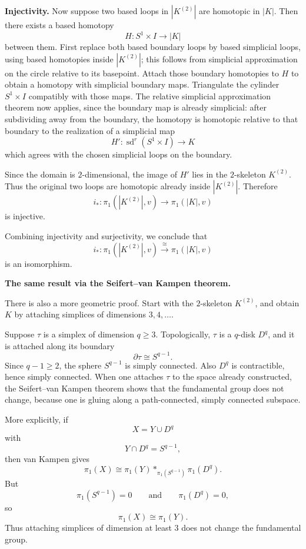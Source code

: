 \begin{solution}
\par

\textbf{Injectivity.}
Now suppose two based loops in \(|K^{(2)}|\) are homotopic in \(|K|\). Then there exists a based homotopy
\[
H:S^1\times I \to |K|
\]
between them. First replace both based boundary loops by based simplicial loops, using based homotopies inside \(|K^{(2)}|\); this follows from simplicial approximation on the circle relative to its basepoint. Attach those boundary homotopies to \(H\) to obtain a homotopy with simplicial boundary maps. Triangulate the cylinder \(S^1\times I\) compatibly with those maps. The relative simplicial approximation theorem now applies, since the boundary map is already simplicial: after subdividing away from the boundary, the homotopy is homotopic relative to that boundary to the realization of a simplicial map
\[
H':\operatorname{sd}^r(S^1\times I)\to K
\]
which agrees with the chosen simplicial loops on the boundary.

Since the domain is \(2\)-dimensional, the image of \(H'\) lies in the \(2\)-skeleton \(K^{(2)}\). Thus the original two loops are homotopic already inside \(|K^{(2)}|\). Therefore
\[
i_*:\pi_1(|K^{(2)}|,v)\to \pi_1(|K|,v)
\]
is injective.

Combining injectivity and surjectivity, we conclude that
\[
i_*:\pi_1(|K^{(2)}|,v)\xrightarrow{\cong}\pi_1(|K|,v)
\]
is an isomorphism.

\par

\textbf{The same result via the Seifert--van Kampen theorem.}

There is also a more geometric proof. Start with the \(2\)-skeleton \(K^{(2)}\), and obtain \(K\) by attaching simplices of dimensions \(3,4,\dots\).

Suppose \(\tau\) is a simplex of dimension \(q\ge 3\). Topologically, \(\tau\) is a \(q\)-disk \(D^q\), and it is attached along its boundary
\[
\partial \tau \cong S^{q-1}.
\]
Since \(q-1\ge 2\), the sphere \(S^{q-1}\) is simply connected. Also \(D^q\) is contractible, hence simply connected. When one attaches \(\tau\) to the space already constructed, the Seifert--van Kampen theorem shows that the fundamental group does not change, because one is gluing along a path-connected, simply connected subspace.

More explicitly, if
\[
X = Y \cup D^q
\]
with
\[
Y\cap D^q = S^{q-1},
\]
then van Kampen gives
\[
\pi_1(X)\cong \pi_1(Y) *_{\pi_1(S^{q-1})} \pi_1(D^q).
\]
But
\[
\pi_1(S^{q-1})=0
\qquad\text{and}\qquad
\pi_1(D^q)=0,
\]
so
\[
\pi_1(X)\cong \pi_1(Y).
\]
Thus attaching simplices of dimension at least \(3\) does not change the fundamental group.


\end{solution}

